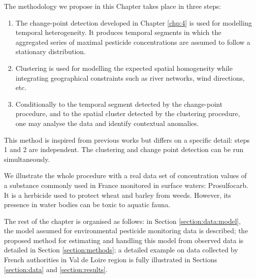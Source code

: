 The methodology we propose in this Chapter takes place in three steps: 
\begin{enumerate}
\item The change-point detection developed in Chapter \ref{chp:4} is used for modelling temporal heterogeneity. It produces temporal segments in which the aggregated series of maximal pesticide concentrations are assumed to follow a stationary distribution. 
\item Clustering is used for modelling the expected spatial homogeneity while integrating geographical constraints such as river networks, wind directions, etc. 
\item Conditionally to the temporal segment detected by the change-point procedure, and to the spatial cluster detected by the clustering procedure, one may analyse the data and identify contextual anomalies. 
\end{enumerate}
This method is inspired from previous works \citep{Laroche2022} but differs on a specific detail: steps 1 and 2 are independent. The clustering and change point detection can be run simultaneously. 

We illustrate the whole procedure with a real data set of concentration values of a substance commonly used in France monitored in surface waters: Prosulfocarb. It is a herbicide used to protect wheat and barley from weeds. However, its presence in water bodies can be toxic to aquatic fauna. 

The rest of the chapter is organised as follows: in Section \ref{section:data:model}, the model assumed for environmental pesticide monitoring data is described; the proposed method for estimating and handling this model from observed data is detailed in Section \ref{section:methods}; a detailed example on data collected by French authorities in Val de Loire region is fully illustrated in Sections \ref{section:data} and \ref{section:results}. 




